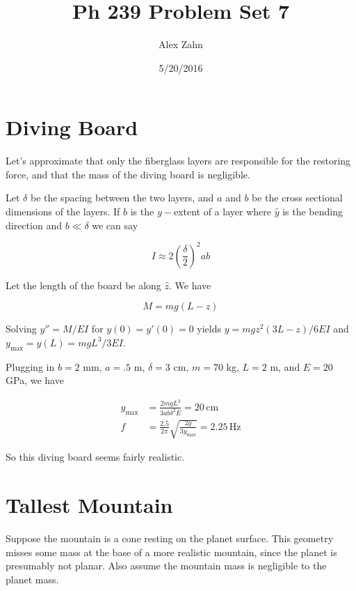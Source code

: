 \documentclass[12pt]{article}
\title{Ph 239 Problem Set 7}
\author{Alex Zahn}
\date{5/20/2016}
\begin{document}
\maketitle

\newcommand{\wmsq}{W/\(\mathrm{m}^2\,\)}
\newcommand{\msq}{\(\mathrm{m}^2\,\)}
\newcommand{\micron}{\(\mu\mathrm{m}\)\,}
\newcommand{\mcb}{\(\mathrm{m}^3\,\)}



\section{Diving Board}

Let's approximate that only the fiberglass layers are responsible for the restoring force, and that the mass of the diving board is negligible.

Let \(\delta\) be the spacing between the two layers, and \(a\) and \(b\) be the cross sectional dimensions of the layers. If \(b\) is the \(y-\)extent of a layer where \(\hat{y}\) is the bending direction and \( b  \ll \delta\) we can say

\[ I \approx 2  \left(\frac{\delta}{2} \right)^2 ab
\]

Let the length of the board be along \(\hat{z}\). We have

\[ M = mg(L-z)
\]

Solving \(y'' = M/EI\) for \(y(0) = y'(0) = 0\) yields \(y=mgz^2(3L-z)/6EI\) and \(y_{\mathrm{max}}=y(L)=mgL^3/3EI\).

Plugging in \(b=2\) mm, \(a= .5\) m, \(\delta = 3 \) cm, \(m= 70\) kg, \(L = 2\) m, and \(E = 20\) GPa, we have

\begin{align*}
y_{\mathrm{max}} &= \frac{2mgL^3}{3ab\delta^2 E} = 20\,\mathrm{cm} \\[12pt]
f &= \frac{2.5}{2\pi}\sqrt{\frac{2g}{3y_{\mathrm{max}}}} = 2.25 \,\mathrm{Hz}
\end{align*}

So this diving board seems fairly realistic.



\section{Tallest Mountain}

Suppose the mountain is a cone resting on the planet surface. This geometry misses some mass at the base of a more realistic mountain, since the planet is presumably not planar. Also assume the mountain mass is negligible to the planet mass.
 
\end{document}
